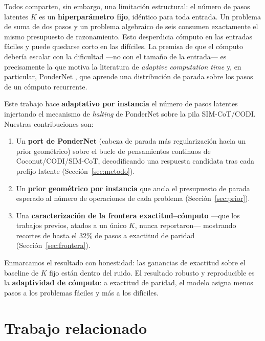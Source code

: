 \documentclass[11pt]{article}
\begin{document}
Todos comparten, sin embargo, una limitación estructural: el número de pasos latentes $K$ es un \textbf{hiperparámetro fijo}, idéntico para toda entrada. Un problema de suma de dos pasos y un problema algebraico de seis consumen exactamente el mismo presupuesto de razonamiento. Esto desperdicia cómputo en las entradas fáciles y puede quedarse corto en las difíciles. La premisa de que el cómputo debería escalar con la dificultad ---no con el tamaño de la entrada--- es precisamente la que motiva la literatura de \emph{adaptive computation time} \citep{graves2016act} y, en particular, PonderNet \citep{banino2021pondernet}, que aprende una distribución de parada sobre los pasos de un cómputo recurrente.

Este trabajo hace \textbf{adaptativo por instancia} el número de pasos latentes injertando el mecanismo de \textit{halting} de PonderNet sobre la pila SIM-CoT/CODI. Nuestras contribuciones son:

\begin{enumerate}
  \item Un \textbf{port de PonderNet} (cabeza de parada más regularización hacia un prior geométrico) sobre el bucle de pensamientos continuos de Coconut/CODI/SIM-CoT, decodificando una respuesta candidata tras cada prefijo latente (Sección~\ref{sec:metodo}).
  \item Un \textbf{prior geométrico por instancia} que ancla el presupuesto de parada esperado al número de operaciones de cada problema (Sección~\ref{sec:prior}).
  \item Una \textbf{caracterización de la frontera exactitud--cómputo} ---que los trabajos previos, atados a un único $K$, nunca reportaron--- mostrando recortes de hasta el $32\%$ de pasos a exactitud de paridad (Sección~\ref{sec:frontera}).
\end{enumerate}

Enmarcamos el resultado con honestidad: las ganancias de exactitud sobre el baseline de $K$ fijo están dentro del ruido. El resultado robusto y reproducible es la \textbf{adaptividad de cómputo}: a exactitud de paridad, el modelo asigna menos pasos a los problemas fáciles y más a los difíciles.

\section{Trabajo relacionado}
\end{document}
